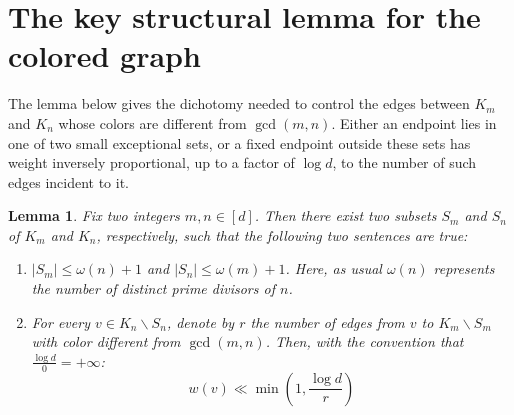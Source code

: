 \documentclass[11pt]{amsart}
\newtheorem{lem}[thm]{Lemma}
\theoremstyle{remark}
\begin{document}
\section{The key structural lemma for the colored graph}
\label{sec:structural-lemma}

The lemma below gives the dichotomy needed to control the edges between
$K_m$ and $K_n$ whose colors are different from $\gcd(m,n)$. Either an
endpoint lies in one of two small exceptional sets, or a fixed endpoint
outside these sets has weight inversely proportional, up to a factor of
$\log d$, to the number of such edges incident to it.

\begin{lem} \label{lem:relative-structural-decomposition}
  Fix two integers $m, n \in [d]$. Then there exist two subsets $S_m$ and $S_n$ of $K_m$ and $K_n$, respectively, such that the following two sentences are true:
  \begin{enumerate}
    \item $|S_m| \leq \omega(n) + 1$ and $|S_n| \leq \omega(m) + 1$. Here, as usual $\omega(n)$ represents the number of distinct prime divisors of $n$.
    \item For every $v \in K_n \backslash S_n$, denote by $r$ the number of edges from $v$ to $K_m \backslash S_m$ with color different from $\gcd(m, n)$. Then, with the convention that $\frac{\log d}{0}=+\infty$:
    \begin{equation}
      w(v) \ll \min(1, \frac{\log d}{r})
    \end{equation}
  \end{enumerate}
\end{lem}
\end{document}
